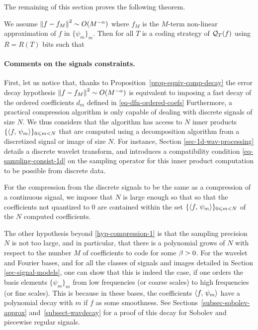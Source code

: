 The remaining of this section proves the following theorem.

\begin{thm}
	We assume $\left\| f-f_M \right\|^2 \sim O(M^{-\alpha})$ where $f_M$ is the $M$-term non-linear approximation of $f$ in $\{\psi_m\}_m$.
	Then for all $T$ is a coding strategy of $\mathcal{Q}_T(f)$ using $R=R(T)$ bits such that 
\end{thm}


\paragraph{Comments on the signals constraints.}

First, let us notice that, thanks to Proposition~\ref{prop-equiv-comp-decay} the error decay hypothesis $\left\| f-f_M \right\|^2 \sim O(M^{-\alpha})$ is equivalent to imposing a fast decay of the ordered coefficients $d_m$ defined in \eqref{eq-dfn-ordered-coefs}
Furthermore, a practical compression algorithm is only capable of dealing with discrete signals of size $N$. We thus considers that the algorithm has access to $N$ inner products $\{ \langle f,\,\psi_m\rangle \}_{0 \leqslant m < N}$ that are computed using a decomposition algorithm from a discretized signal or image of size $N$. For instance, Section \ref{sec-1d-wav-processing} details a discrete wavelet transform, and introduces a compatibility condition \eqref{eq-sampling-consist-1d} on the sampling operator for this inner product computation to be possible from discrete data.  

For the compression from the discrete signals to be the same as a compression of a continuous signal, we impose that $N$ is large enough so that 
so that the coefficients not quantized to $0$ are contained within the set $\{ \langle f,\,\psi_m\rangle \}_{0 \leqslant m < N}$ of the $N$ computed coefficients.

The other hypothesis beyond \eqref{hyp-compression-1} is that the sampling precision $N$ is not too large, and in particular, that there is a polynomial grows of $N$ with respect to the number $M$ of coefficients to code
for some $\beta > 0$. For the wavelet and Fourier bases, and for all the classes of signals and images detailed in Section \ref{sec-signal-models}, one can show that this is indeed the case, if one orders the basis elements $\{\psi_m\}_m$ from low frequencies (or coarse scales) to high frequencies (or fine scales). This is because in these bases, the coefficients $\langle f,\,\psi_m\rangle$ have a polynomial decay with $m$ if $f$ as some smoothness. See Sections~\ref{subsec-sobolev-approx} and~\ref{subsect-wavdecay} for a proof of this decay for Sobolev and piecewise regular signals.


